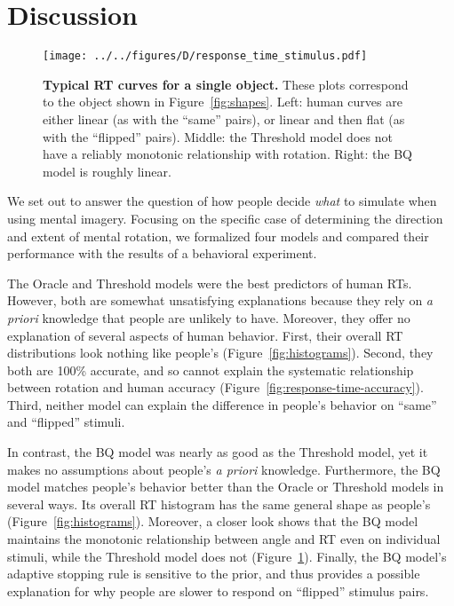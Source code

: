 \documentclass[10pt,letterpaper]{article}
\newcommand{\Oc}[0]{Oracle}
\newcommand{\Th}[0]{Threshold}
\newcommand{\Bq}[0]{BQ}
\begin{document}
\section{Discussion}

\begin{figure}[t]
  \begin{center}
    \texttt{[image: ../../figures/D/response\_time\_stimulus.pdf]}
    \caption{\textbf{Typical RT curves for a single object.}  These
      plots correspond to the object shown in
      Figure~\ref{fig:shapes}. Left: human curves are either linear
      (as with the ``same'' pairs), or linear and then flat (as with
      the ``flipped'' pairs). Middle: the \Th{} model does not have a
      reliably monotonic relationship with rotation. Right: the \Bq{}
      model is roughly linear.}
    \label{fig:response-time-stimulus}
  \end{center}
\end{figure}

We set out to answer the question of how people decide \textit{what}
to simulate when using mental imagery. Focusing on the specific case
of determining the direction and extent of mental rotation, we
formalized four models and compared their performance with the results
of a behavioral experiment.

The \Oc{} and \Th{} models were the best predictors of human
RTs. However, both are somewhat unsatisfying explanations because they
rely on \textit{a priori} knowledge that people are unlikely to
have. Moreover, they offer no explanation of several aspects of human
behavior. First, their overall RT distributions look nothing like
people's (Figure~\ref{fig:histograms}).  Second, they both are 100\%
accurate, and so cannot explain the systematic relationship between
rotation and human accuracy
(Figure~\ref{fig:response-time-accuracy}). Third, neither model can
explain the difference in people's behavior on ``same'' and
``flipped'' stimuli.

In contrast, the \Bq{} model was nearly as good as the \Th{} model,
yet it makes no assumptions about people's \textit{a priori}
knowledge. Furthermore, the \Bq{} model matches people's behavior
better than the \Oc{} or \Th{} models in several ways. Its overall RT
histogram has the same general shape as people's
(Figure~\ref{fig:histograms}).  Moreover, a closer look shows that the
\Bq{} model maintains the monotonic relationship between angle and RT
even on individual stimuli, while the \Th{} model does not
(Figure~\ref{fig:response-time-stimulus}). Finally, the \Bq{} model's
adaptive stopping rule is sensitive to the prior, and thus provides a
possible explanation for why people are slower to respond on
``flipped'' stimulus pairs.
\end{document}
